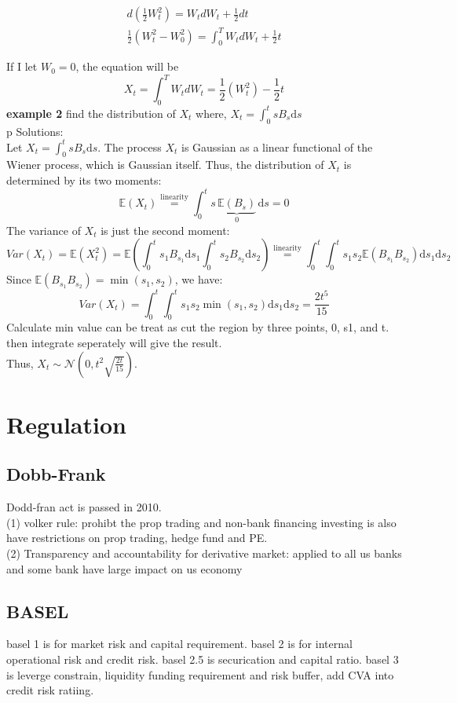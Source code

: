 \documentclass[a4paper,11pt]{article}
\begin{document}
\begin{equation}
\begin{aligned}
d(\frac{1}{2}W_t^2)=W_t dW_t+\frac{1}{2}dt\\
\frac{1}{2}(W_t^2-W_0^2)=\int_0^T W_t dW_t+\frac{1}{2}t
\end{aligned}
\end{equation}

If I let $W_0=0$, the equation will be
$$X_t= \int_0^T W_tdW_t=\frac{1}{2}(W_t^2)-\frac{1}{2}t$$
{\bf example 2}
find the distribution of $X_t$ where, $X_t=\int_0^t sB_s\mathrm{d}s$\\p
Solutions:\\
Let $X_t = \int_0^t s B_s \mathrm{d}s$. The process $X_t$ is Gaussian as a linear functional of the Wiener process, which is Gaussian itself. Thus, the distribution of $X_t$ is determined by its two moments:
$$
    \mathbb{E}\left(X_t\right) \stackrel{\text{linearity}}{=} \int_0^t s \, \underbrace{\mathbb{E}\left(B_s\right)}_0 \, \mathrm{d}s  = 0
$$
The variance of $X_t$ is just the second moment:
$$
   Var(X_t)= \mathbb{E}\left(X_t^2\right) = \mathbb{E}\left( \int_0^t s_1 B_{s_1} \mathrm{d}s_1  \int_0^t s_2 B_{s_2} \mathrm{d}s_2 \right)  \stackrel{\text{linearity}}{=} \int_0^t \int_0^t s_1 s_2 \mathbb{E}\left(B_{s_1} B_{s_2}\right) \mathrm{d}s_1 \mathrm{d}s_2
$$
Since $\mathbb{E}\left(B_{s_1} B_{s_2}\right) = \min(s_1, s_2)$, we have:
$$
  Var(X_t)= \int_0^t \int_0^t s_1 s_2 \min(s_1, s_2) \mathrm{d}s_1 \mathrm{d}s_2 = \frac{2 t^5}{15}
$$
Calculate min value can be treat as cut the region by three points, 0, s1, and t. then integrate seperately will give the result.\\
Thus, $X_t \sim \mathcal{N}\left(0, t^2 \sqrt{\frac{2 t}{15}} \right)$.
\section{Regulation}
\subsection{Dobb-Frank}
Dodd-fran act is passed in 2010.\\
(1) volker rule: prohibt the prop trading and non-bank financing investing is also have restrictions on prop trading, hedge fund and PE. \\
(2) Transparency and accountability for derivative market: applied to all us banks and some bank have large impact on us economy\\
\subsection{BASEL}
basel 1 is for market risk and capital requirement. basel 2 is for internal operational risk and credit risk. basel 2.5 is securication and capital ratio. basel 3 is leverge constrain, liquidity funding requirement and risk buffer, add CVA into credit risk ratiing.
\end{document}
